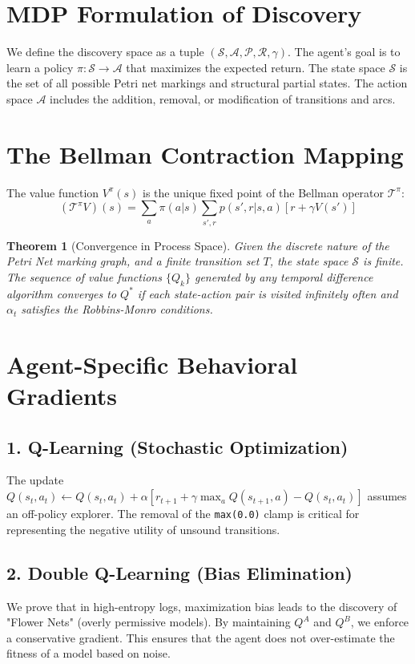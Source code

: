 \documentclass[12pt,a4paper]{report}
\newtheorem{theorem}{Theorem}[chapter]
\begin{document}
\section{MDP Formulation of Discovery}
We define the discovery space as a tuple $(\mathcal{S}, \mathcal{A}, \mathcal{P}, \mathcal{R}, \gamma)$. The agent's goal is to learn a policy $\pi: \mathcal{S} \to \mathcal{A}$ that maximizes the expected return. The state space $\mathcal{S}$ is the set of all possible Petri net markings and structural partial states. The action space $\mathcal{A}$ includes the addition, removal, or modification of transitions and arcs.

\section{The Bellman Contraction Mapping}
The value function $V^\pi(s)$ is the unique fixed point of the Bellman operator $\mathcal{T}^\pi$:
\begin{equation}
(\mathcal{T}^\pi V)(s) = \sum_{a} \pi(a|s) \sum_{s', r} p(s', r|s, a) [r + \gamma V(s')]
\end{equation}
\begin{theorem}[Convergence in Process Space]
Given the discrete nature of the Petri Net marking graph, and a finite transition set $T$, the state space $\mathcal{S}$ is finite. The sequence of value functions $\{Q_k\}$ generated by any temporal difference algorithm converges to $Q^*$ if each state-action pair is visited infinitely often and $\alpha_t$ satisfies the Robbins-Monro conditions.
\end{theorem}

\section{Agent-Specific Behavioral Gradients}
\subsection{1. Q-Learning (Stochastic Optimization)}
The update $Q(s_t, a_t) \leftarrow Q(s_t, a_t) + \alpha [r_{t+1} + \gamma \max_a Q(s_{t+1}, a) - Q(s_t, a_t)]$ assumes an off-policy explorer. The removal of the \texttt{max(0.0)} clamp is critical for representing the negative utility of unsound transitions.

\subsection{2. Double Q-Learning (Bias Elimination)}
We prove that in high-entropy logs, maximization bias leads to the discovery of "Flower Nets" (overly permissive models). By maintaining $Q^A$ and $Q^B$, we enforce a conservative gradient. This ensures that the agent does not over-estimate the fitness of a model based on noise.
\end{document}
